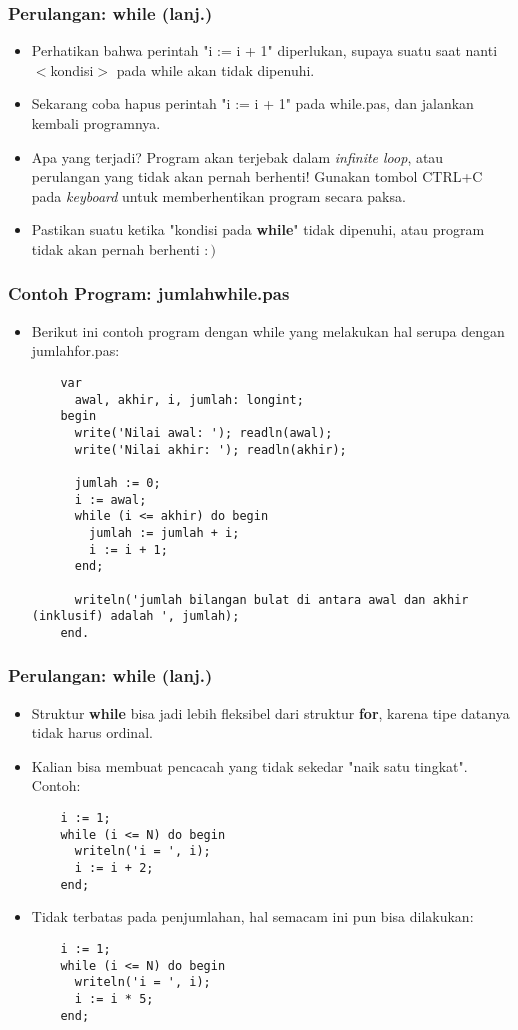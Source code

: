 \begin{frame}
\frametitle{Perulangan: while (lanj.)}
\begin{itemize}
  \item Perhatikan bahwa perintah "i := i + 1" diperlukan, supaya suatu saat nanti $<$kondisi$>$ pada while akan tidak dipenuhi.
  \item Sekarang coba hapus perintah "i := i + 1" pada while.pas, dan jalankan kembali programnya.
  \item Apa yang terjadi? Program akan terjebak dalam \alert{\textit{infinite loop}}, atau \alert{perulangan yang tidak akan pernah berhenti}! Gunakan tombol CTRL+C pada \textit{keyboard} untuk memberhentikan program secara paksa.
  \item Pastikan suatu ketika "kondisi pada \textbf{while}" tidak dipenuhi, atau program tidak akan pernah berhenti $:)$
\end{itemize}
\end{frame}

\begin{frame}[fragile]
\frametitle{Contoh Program: jumlahwhile.pas}
\begin{itemize}
  \item Berikut ini contoh program dengan while yang melakukan hal serupa dengan jumlahfor.pas:
  \begin{lstlisting}
    var
      awal, akhir, i, jumlah: longint;
    begin
      write('Nilai awal: '); readln(awal);
      write('Nilai akhir: '); readln(akhir);

      jumlah := 0;
      i := awal;
      while (i <= akhir) do begin
        jumlah := jumlah + i;
        i := i + 1;
      end;

      writeln('jumlah bilangan bulat di antara awal dan akhir (inklusif) adalah ', jumlah);
    end.
  \end{lstlisting}
\end{itemize}
\end{frame}

\begin{frame}[fragile]
\frametitle{Perulangan: while (lanj.)}
\begin{itemize}
  \item Struktur \textbf{while} bisa jadi lebih fleksibel dari struktur \textbf{for}, karena tipe datanya tidak harus ordinal.
  \item Kalian bisa membuat pencacah yang tidak sekedar "naik satu tingkat". Contoh:
  \begin{lstlisting}
    i := 1;
    while (i <= N) do begin
      writeln('i = ', i);
      i := i + 2;
    end;
  \end{lstlisting}

  \item Tidak terbatas pada penjumlahan, hal semacam ini pun bisa dilakukan:
  \begin{lstlisting}
    i := 1;
    while (i <= N) do begin
      writeln('i = ', i);
      i := i * 5;
    end;
  \end{lstlisting}
\end{itemize}
\end{frame}

